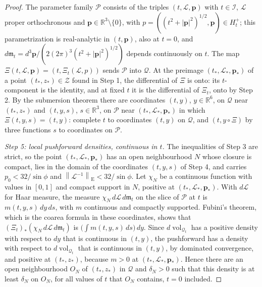\documentclass[11pt]{amsart}
\numberwithin{equation}{section}
\theoremstyle{definition}
\newcommand{\R}{\mathbb R}
\newcommand{\bp}{\mathbf p}
\newcommand{\vol}{\operatorname{vol}}
\newcommand{\norm}[1]{\left\|#1\right\|}
\begin{document}
\begin{proof}
The parameter family \(\mathcal P\) consists of the
triples \((t,\mathcal L,\bp)\) with \(t\in\mathcal I\), \(\mathcal L\) proper
orthochronous and \(\bp\in\R^3\setminus\{0\}\), with
\(p=((t^2+|\bp|^2)^{1/2},\bp)\in H_t^+\); this parametrization is
real-analytic in \((t,\bp)\), also at \(t=0\), and
\(d\mathfrak m_t=d^3\bp/(2(2\pi)^3(t^2+|\bp|^2)^{1/2})\) depends continuously
on \(t\). The map \(\Xi(t,\mathcal L,\bp)=(t,\Xi_t(\mathcal L,p))\) sends
\(\mathcal P\) into \(\mathcal Q\). At the preimage
\((t_*,\mathcal L_*,\bp_*)\) of a point \((t_*,z_*)\in\mathscr Z\) found in
Step 1, the differential of \(\Xi\) is onto: its \(t\)-component is the
identity, and at fixed \(t\) it is the differential of \(\Xi_t\), onto by
Step 2. By the submersion theorem there are coordinates \((t,y)\),
\(y\in\R^6\), on \(\mathcal Q\) near \((t_*,z_*)\) and \((t,y,s)\),
\(s\in\R^3\), on \(\mathcal P\) near \((t_*,\mathcal L_*,\bp_*)\) in which
\(\Xi(t,y,s)=(t,y)\): complete \(t\) to coordinates \((t,y)\) on
\(\mathcal Q\), and \((t,y\circ\Xi)\) by three functions \(s\) to coordinates
on \(\mathcal P\).

\smallskip
\emph{Step 5: local pushforward densities, continuous in \(t\).} The
inequalities of Step 3 are strict, so the point
\((t_*,\mathcal L_*,\bp_*)\) has an open neighbourhood \(N\) whose closure is
compact, lies in the domain of the coordinates \((t,y,s)\) of Step 4, and carries \(p_0<32/{\sin\phi}\) and
\(\norm{\mathcal L^{-1}}_{\mathrm E}<32/{\sin\phi}\). Let \(\chi_N\) be a
continuous function with values in \([0,1]\) and compact support in \(N\),
positive at \((t_*,\mathcal L_*,\bp_*)\). With \(d\mathcal L\) for Haar
measure, the measure \(\chi_N\,d\mathcal L\,d\mathfrak m_t\) on the slice of
\(\mathcal P\) at \(t\) is \(m(t,y,s)\,dy\,ds\), with \(m\) continuous and
compactly supported. Fubini's theorem, which is the coarea formula in these
coordinates, shows that \((\Xi_t)_*(\chi_N\,d\mathcal L\,d\mathfrak m_t)\) is
\(\bigl(\int m(t,y,s)\,ds\bigr)\,dy\). Since \(d\vol_{\mathcal Q_t}\) has a
positive density with respect to \(dy\) that is continuous in \((t,y)\), the pushforward has a
density with respect to \(d\vol_{\mathcal Q_t}\) that is continuous in
\((t,y)\), by dominated convergence, and positive at \((t_*,z_*)\), because
\(m>0\) at \((t_*,\mathcal L_*,\bp_*)\). Hence there are an open
neighbourhood \(O_N\) of \((t_*,z_*)\) in \(\mathcal Q\) and \(\delta_N>0\)
such that this density is at least \(\delta_N\) on \(O_N\), for all values of
\(t\) that \(O_N\) contains, \(t=0\) included.


\end{proof}
\end{document}
